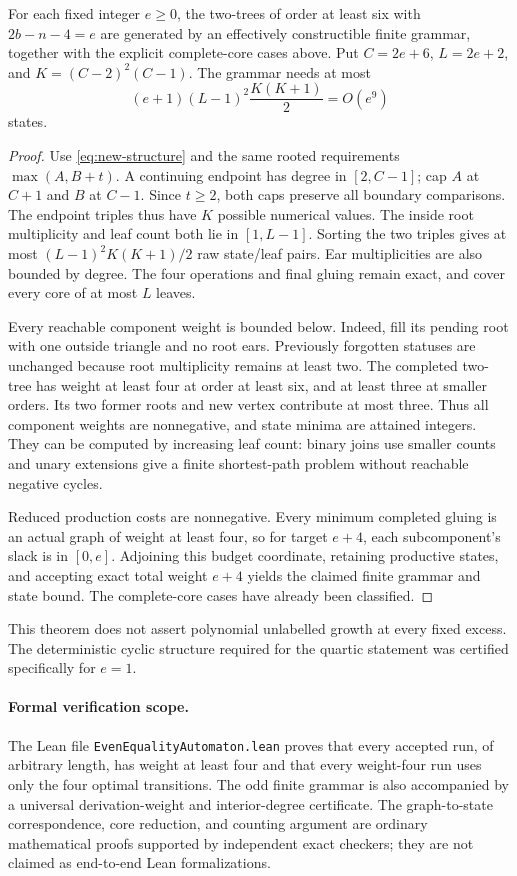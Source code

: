 \begin{theorem}
For each fixed integer $e\ge0$, the two-trees of order at least six
with $2b-n-4=e$ are generated by an effectively constructible finite
grammar, together with the explicit complete-core cases above.
Put $C=2e+6$, $L=2e+2$, and $K=(C-2)^2(C-1)$.  The grammar needs
at most
\[
 (e+1)(L-1)^2\frac{K(K+1)}2=O(e^9)
\]
states.
\end{theorem}

\begin{proof}
Use \eqref{eq:new-structure} and the same rooted requirements
$\max(A,B+t)$.  A continuing endpoint has degree in $[2,C-1]$;
cap $A$ at $C+1$ and $B$ at $C-1$.  Since $t\ge2$, both caps
preserve all boundary comparisons.  The endpoint triples thus
have $K$ possible numerical values.  The inside root multiplicity
and leaf count both lie in $[1,L-1]$.  Sorting the two triples gives
at most $(L-1)^2K(K+1)/2$ raw state/leaf pairs.  Ear multiplicities
are also bounded by degree.  The four operations and final gluing
remain exact, and cover every core of at most $L$ leaves.

Every reachable component weight is bounded below.  Indeed, fill its
pending root with one outside triangle and no root ears.  Previously
forgotten statuses are unchanged because root multiplicity remains
at least two.  The completed two-tree has weight at least four at
order at least six, and at least three at smaller orders.  Its two
former roots and new vertex contribute at most three.  Thus all
component weights are nonnegative, and state minima are attained
integers.  They can be computed by increasing leaf count: binary
joins use smaller counts and unary extensions give a finite
shortest-path problem without reachable negative cycles.

Reduced production costs are nonnegative.  Every minimum completed
gluing is an actual graph of weight at least four, so for target
$e+4$, each subcomponent's slack is in $[0,e]$.  Adjoining this
budget coordinate, retaining productive states, and accepting
exact total weight $e+4$ yields the claimed finite grammar and state
bound.  The complete-core cases have already been classified.
\end{proof}

This theorem does not assert polynomial unlabelled growth at every
fixed excess.  The deterministic cyclic structure required for the
quartic statement was certified specifically for $e=1$.

\paragraph{Formal verification scope.}
The Lean file \texttt{EvenEqualityAutomaton.lean} proves that every
accepted run, of arbitrary length, has weight at least four and
that every weight-four run uses only the four optimal transitions.
The odd finite grammar is also accompanied by a universal
derivation-weight and interior-degree certificate.  The
graph-to-state correspondence, core reduction, and counting
argument are ordinary mathematical proofs supported by independent
exact checkers; they are not claimed as end-to-end Lean
formalizations.

